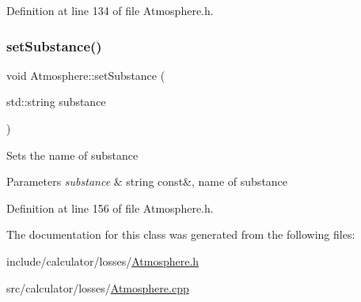 Definition at line 134 of file Atmosphere.\+h.

\mbox{\label{class_atmosphere_aa92f55a1f07304f3e57fdfb8ece65d82}} 
\subsubsection{\texorpdfstring{set\+Substance()}{setSubstance()}}
{\footnotesize\ttfamily void Atmosphere\+::set\+Substance (\begin{DoxyParamCaption}\item[{std\+::string}]{substance }\end{DoxyParamCaption})\hspace{0.3cm}{\ttfamily [inline]}}

Sets the name of substance 
\begin{DoxyParams}{Parameters}
{\em substance} & string const\&, name of substance \\
\hline
\end{DoxyParams}


Definition at line 156 of file Atmosphere.\+h.



The documentation for this class was generated from the following files\+:\begin{DoxyCompactItemize}
\item 
include/calculator/losses/\hyperlink{_atmosphere_8h}{Atmosphere.\+h}\item 
src/calculator/losses/\hyperlink{_atmosphere_8cpp}{Atmosphere.\+cpp}\end{DoxyCompactItemize}
